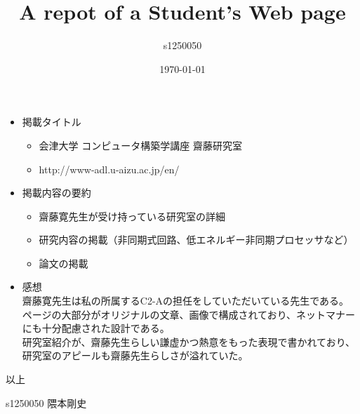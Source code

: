 \documentclass[a4paper]{jarticle}
\title{A repot of a Student's Web page}
\author{s1250050}
\date{\today}
\begin{document}
\maketitle
\begin{itemize}
\item 掲載タイトル \\
  \begin{itemize}
    \item 会津大学 コンピュータ構築学講座 齋藤研究室
    \item http://www-adl.u-aizu.ac.jp/en/
  \end{itemize}
\item 掲載内容の要約 \\
  \begin{itemize}
    \item 齋藤寛先生が受け持っている研究室の詳細
    \item 研究内容の掲載（非同期式回路、低エネルギー非同期プロセッサなど）
    \item 論文の掲載
  \end{itemize}
\item 感想 \\
  齋藤寛先生は私の所属するC2-Aの担任をしていただいている先生である。\\
  ページの大部分がオリジナルの文章、画像で構成されており、ネットマナーにも十分配慮された設計である。\\
  研究室紹介が、齋藤先生らしい謙虚かつ熱意をもった表現で書かれており、研究室のアピールも齋藤先生らしさが溢れていた。\\
\end{itemize}
以上

s1250050 隈本剛史
\end{document}
